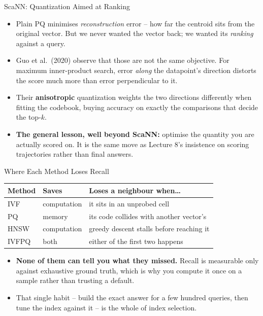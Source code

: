 \begin{frame}{ScaNN: Quantization Aimed at Ranking}
\begin{itemize}
  \item Plain PQ minimises \emph{reconstruction} error -- how far the centroid sits from the original vector. But we never wanted the vector back; we wanted its \emph{ranking} against a query.
  \pause
  \item Guo et al.\ (2020) observe that those are not the same objective. For maximum inner-product search, error \emph{along} the datapoint's direction distorts the score much more than error perpendicular to it.
  \pause
  \item Their \textbf{anisotropic} quantization weights the two directions differently when fitting the codebook, buying accuracy on exactly the comparisons that decide the top-$k$.
  \pause
  \item \textbf{The general lesson, well beyond ScaNN:} optimise the quantity you are actually scored on. It is the same move as Lecture 8's insistence on scoring trajectories rather than final answers.
\end{itemize}
\end{frame}

\begin{frame}{Where Each Method Loses Recall}
\centering
\small
\begin{tabular}{@{}l|l|l@{}}
\textbf{Method} & \textbf{Saves} & \textbf{Loses a neighbour when\ldots} \\
\hline
IVF & computation & it sits in an unprobed cell \\[2pt]
PQ & memory & its code collides with another vector's \\[2pt]
HNSW & computation & greedy descent stalls before reaching it \\[2pt]
IVFPQ & both & either of the first two happens \\
\end{tabular}

\vspace{0.8em}
\begin{itemize}
  \item \textbf{None of them can tell you what they missed.} Recall is measurable only against exhaustive ground truth, which is why you compute it once on a sample rather than trusting a default.
  \pause
  \item That single habit -- build the exact answer for a few hundred queries, then tune the index against it -- is the whole of index selection.
\end{itemize}
\end{frame}
